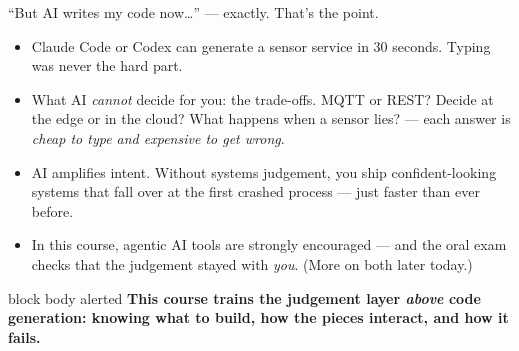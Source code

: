 \documentclass[aspectratio=169]{beamer}
\newcommand{\hilite}[1]{\textcolor{accentColor}{#1}}
\newcommand{\subtle}[1]{\textcolor{subtleColor}{#1}}
\begin{document}
\begin{frame}{``But AI writes my code now\ldots'' — exactly. That's the point.}
	\begin{itemize}
		\setlength\itemsep{0.45em}
		\item Claude Code or Codex can generate a sensor service in 30 seconds.
		\hilite{Typing was never the hard part.}
		\item What AI \emph{cannot} decide for you: \hilite{the trade-offs}.
		MQTT or REST? Decide at the edge or in the cloud? What happens when a sensor lies?
		— each answer is \emph{cheap to type and expensive to get wrong}.
		\item AI amplifies intent. Without systems judgement, you ship confident-looking
		systems that fall over at the first crashed process — \hilite{just faster than ever before}.
		\item In this course, agentic AI tools are \hilite{strongly encouraged} — and the oral exam
		checks that the judgement stayed with \emph{you}. \subtle{(More on both later today.)}
	\end{itemize}
	\vspace{0.3em}
	\begin{beamercolorbox}[rounded=true,sep=5pt]{block body alerted}
		\color{mainColor}\small\textbf{This course trains the judgement layer \emph{above} code generation:
		knowing what to build, how the pieces interact, and how it fails.}
	\end{beamercolorbox}
	\vspace{0.2em}
\end{frame}
\end{document}
